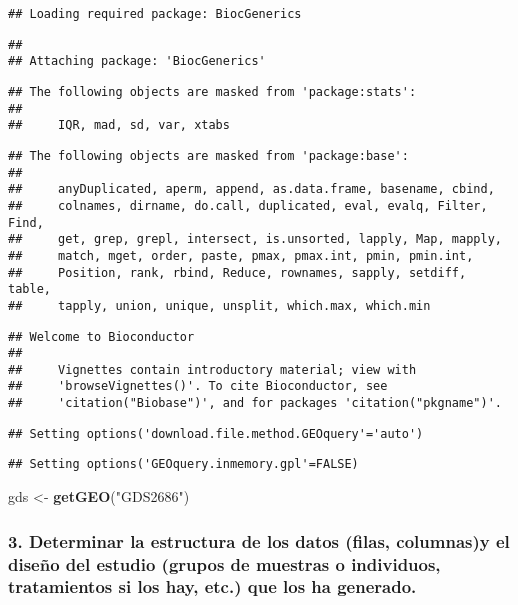 \documentclass[
]{article}
\newenvironment{Shaded}{\begin{snugshade}}{\end{snugshade}}
\newcommand{\FunctionTok}[1]{\textcolor[rgb]{0.13,0.29,0.53}{\textbf{#1}}}
\newcommand{\NormalTok}[1]{#1}
\newcommand{\OtherTok}[1]{\textcolor[rgb]{0.56,0.35,0.01}{#1}}
\newcommand{\StringTok}[1]{\textcolor[rgb]{0.31,0.60,0.02}{#1}}
\begin{document}
\begin{verbatim}
## Loading required package: BiocGenerics
\end{verbatim}

\begin{verbatim}
## 
## Attaching package: 'BiocGenerics'
\end{verbatim}

\begin{verbatim}
## The following objects are masked from 'package:stats':
## 
##     IQR, mad, sd, var, xtabs
\end{verbatim}

\begin{verbatim}
## The following objects are masked from 'package:base':
## 
##     anyDuplicated, aperm, append, as.data.frame, basename, cbind,
##     colnames, dirname, do.call, duplicated, eval, evalq, Filter, Find,
##     get, grep, grepl, intersect, is.unsorted, lapply, Map, mapply,
##     match, mget, order, paste, pmax, pmax.int, pmin, pmin.int,
##     Position, rank, rbind, Reduce, rownames, sapply, setdiff, table,
##     tapply, union, unique, unsplit, which.max, which.min
\end{verbatim}

\begin{verbatim}
## Welcome to Bioconductor
## 
##     Vignettes contain introductory material; view with
##     'browseVignettes()'. To cite Bioconductor, see
##     'citation("Biobase")', and for packages 'citation("pkgname")'.
\end{verbatim}

\begin{verbatim}
## Setting options('download.file.method.GEOquery'='auto')
\end{verbatim}

\begin{verbatim}
## Setting options('GEOquery.inmemory.gpl'=FALSE)
\end{verbatim}

\begin{Shaded}
\begin{Highlighting}[]
\NormalTok{gds }\OtherTok{\textless{}{-}} \FunctionTok{getGEO}\NormalTok{(}\StringTok{"GDS2686"}\NormalTok{)}
\end{Highlighting}
\end{Shaded}

\subsubsection{3. Determinar la estructura de los datos (filas,
columnas)y el diseño del estudio (grupos de muestras o individuos,
tratamientos si los hay, etc.) que los ha
generado.}\label{determinar-la-estructura-de-los-datos-filas-columnasy-el-diseuxf1o-del-estudio-grupos-de-muestras-o-individuos-tratamientos-si-los-hay-etc.-que-los-ha-generado.}
\end{document}
